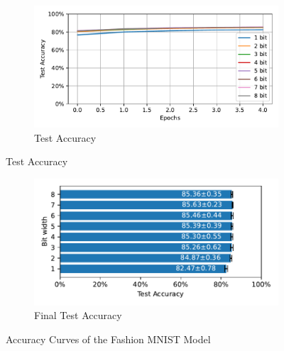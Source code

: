         \begin{figure}[H]
            \centering
            \ContinuedFloat
            \begin{subfigure}[H]{\textwidth}
                \centering
                \includegraphics[width=\textwidth]{../standard/FashionMNIST/plots/fashionmnist_test_acc.pdf}
                \caption{Test Accuracy}
            \end{subfigure}
        \end{figure}
        \begin{figure}[H]
            \centering
            \ContinuedFloat
            \begin{subfigure}[H]{\textwidth}
                \centering
                \includegraphics[width=\textwidth]{../standard/FashionMNIST/plots/fashionmnist_final_acc_horizontal.pdf}
                \caption{Final Test Accuracy}
            \end{subfigure}
            \caption{Accuracy Curves of the Fashion MNIST Model}
        \end{figure}

